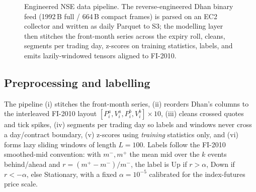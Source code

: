 \documentclass[fonts]{icst}
\begin{document}
\begin{figure}[t]
\centering
{}
\caption{Engineered NSE data pipeline. The reverse-engineered Dhan binary feed (1992\,B full / 664\,B compact
frames) is parsed on an EC2 collector and written as daily Parquet to S3; the modelling layer then stitches
the front-month series across the expiry roll, cleans, segments per trading day, z-scores on training
statistics, labels, and emits lazily-windowed tensors aligned to FI-2010.}
\label{fig:pipeline}
\end{figure}

\subsection{Preprocessing and labelling}
The pipeline (i) stitches the front-month series, (ii) reorders Dhan's columns to the interleaved FI-2010
layout $[P^a_i,V^a_i,P^b_i,V^b_i]\times 10$, (iii) cleans crossed quotes and tick spikes, (iv) segments per
trading day so labels and windows never cross a day/contract boundary, (v) z-scores using \emph{training}
statistics only, and (vi) forms lazy sliding windows of length $L=100$. Labels follow the FI-2010 smoothed-mid
convention: with $m^-,m^+$ the mean mid over the $k$ events behind/ahead and $r=(m^+-m^-)/m^-$, the label is
Up if $r>\alpha$, Down if $r<-\alpha$, else Stationary, with a fixed $\alpha=10^{-5}$ calibrated for the
index-futures price scale.
\end{document}
